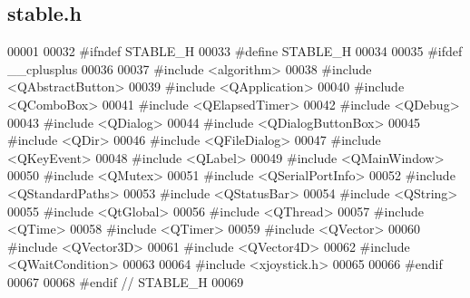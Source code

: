 \hypertarget{a00025_source}{}\subsection{stable.\+h}

\begin{DoxyCode}
00001 
00032 \textcolor{preprocessor}{#ifndef STABLE\_H}
00033 \textcolor{preprocessor}{#define STABLE\_H}
00034 
00035 \textcolor{preprocessor}{#ifdef \_\_cplusplus}
00036 
00037 \textcolor{preprocessor}{#include <algorithm>}
00038 \textcolor{preprocessor}{#include <QAbstractButton>}
00039 \textcolor{preprocessor}{#include <QApplication>}
00040 \textcolor{preprocessor}{#include <QComboBox>}
00041 \textcolor{preprocessor}{#include <QElapsedTimer>}
00042 \textcolor{preprocessor}{#include <QDebug>}
00043 \textcolor{preprocessor}{#include <QDialog>}
00044 \textcolor{preprocessor}{#include <QDialogButtonBox>}
00045 \textcolor{preprocessor}{#include <QDir>}
00046 \textcolor{preprocessor}{#include <QFileDialog>}
00047 \textcolor{preprocessor}{#include <QKeyEvent>}
00048 \textcolor{preprocessor}{#include <QLabel>}
00049 \textcolor{preprocessor}{#include <QMainWindow>}
00050 \textcolor{preprocessor}{#include <QMutex>}
00051 \textcolor{preprocessor}{#include <QSerialPortInfo>}
00052 \textcolor{preprocessor}{#include <QStandardPaths>}
00053 \textcolor{preprocessor}{#include <QStatusBar>}
00054 \textcolor{preprocessor}{#include <QString>}
00055 \textcolor{preprocessor}{#include <QtGlobal>}
00056 \textcolor{preprocessor}{#include <QThread>}
00057 \textcolor{preprocessor}{#include <QTime>}
00058 \textcolor{preprocessor}{#include <QTimer>}
00059 \textcolor{preprocessor}{#include <QVector>}
00060 \textcolor{preprocessor}{#include <QVector3D>}
00061 \textcolor{preprocessor}{#include <QVector4D>}
00062 \textcolor{preprocessor}{#include <QWaitCondition>}
00063 
00064 \textcolor{preprocessor}{#include <xjoystick.h>}
00065 
00066 \textcolor{preprocessor}{#endif}
00067 
00068 \textcolor{preprocessor}{#endif // STABLE\_H}
00069 
\end{DoxyCode}
